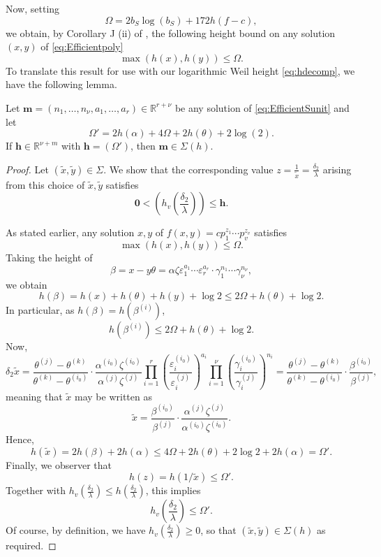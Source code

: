 Now, setting
\[\Omega = 2b_S \log(b_S) + 172h(f-c),\]
we obtain, by Corollary J (ii) of \cite{KanMat}, the following height bound on any solution $(x,y)$ of \eqref{eq:Efficientpoly}
\[\max(h(x),h(y))\leq \Omega.\]
To translate this result for use with our logarithmic Weil height \eqref{eq:hdecomp}, we have the following lemma. 
\begin{lemma} \label{lem:TMinitialheight}
Let ${\mathbf{m} = (n_1, \dots, n_{\nu}, a_1, \dots, a_r) \in \mathbb{R}^{r + \nu}}$ be any solution of \eqref{eq:EfficientSunit} and let 
\begin{equation} \label{eq:Omegaprime}
\Omega' = 2h(\alpha) + 4\Omega + 2h(\theta) + 2\log(2).
\end{equation}
If $\mathbf{h} \in\mathbb{R}^{\nu + m}$ with $\mathbf{h} = (\Omega')$, then $\mathbf{m}\in \Sigma(h)$.
\end{lemma}

\begin{proof}
Let $(\tilde{x},\tilde{y}) \in \Sigma$. We show that the corresponding value $z = \frac{1}{\tilde{x}} = \frac{\delta_2}{\lambda}$ arising from this choice of $\tilde{x},\tilde{y}$ satisfies
\[\mathbf{0} < \left(h_v\left(\frac{\delta_2}{\lambda}\right)\right)\leq \mathbf{h}.\]

As stated earlier, any solution $x,y$ of $f(x,y) = c p_1^{z_1}\cdots p_v^{z_v}$ satisfies
\[\max(h(x),h(y)) \leq \Omega.\]
Taking the height of 
\[\beta = x-y\theta = \alpha \zeta \varepsilon_1^{a_1} \cdots \varepsilon_r^{a_r}\cdot \gamma_1^{n_1}\cdots \gamma_{\nu}^{n_{\nu}},\]
we obtain
\[h(\beta) = h(x) + h(\theta) + h(y) + \log{2}  \leq 2\Omega + h(\theta) + \log{2}.\]
In particular, as $h(\beta) = h(\beta^{(i)})$, 
\[h(\beta^{(i)}) \leq 2\Omega + h(\theta) + \log{2}.\]
Now, 
\[\delta_2\tilde{x} 
	= \frac{\theta^{(j)} - \theta^{(k)}}{\theta^{(k)} - \theta^{(i_0)}}\cdot \frac{\alpha^{(i_0)}\zeta^{(i_0)}}{\alpha^{(j)}\zeta^{(j)}} \prod_{i = 1}^{r}\left( \frac{\varepsilon_i^{(i_0)}}{\varepsilon_i^{(j)}}\right)^{a_i} \prod_{i = 1}^{\nu} \left( \frac{\gamma_i^{(i_0)}}{\gamma_i^{(j)}}\right)^{n_i}  
	= \frac{\theta^{(j)} - \theta^{(k)}}{\theta^{(k)} - \theta^{(i_0)}}\cdot \frac{\beta^{(i_0)}}{\beta^{(j)}},\]
meaning that $\tilde{x}$ may be written as
\[\tilde{x} =\frac{\beta^{(i_0)}}{\beta^{(j)}}\cdot \frac{\alpha^{(j)}\zeta^{(j)}}{\alpha^{(i_0)}\zeta^{(i_0)}}.\]
Hence, 
\[h(\tilde{x})	 = 2h(\beta) + 2h(\alpha) \leq 4\Omega + 2h(\theta) + 2\log{2} + 2h(\alpha) = \Omega'.\]
Finally, we observer that 
\[h(z) = h(1/\tilde{x}) \leq \Omega'.\]
Together with $\displaystyle h_v\left(\frac{\delta_2}{\lambda}\right) \leq h\left(\frac{\delta_2}{\lambda}\right)$, this implies
\[h_v\left(\frac{\delta_2}{\lambda}\right) \leq \Omega'.\]
Of course, by definition, we have $h_v\left(\frac{\delta_2}{\lambda}\right) \geq 0$, so that $(\tilde{x},\tilde{y}) \in \Sigma(h)$ as required. 
\end{proof}

